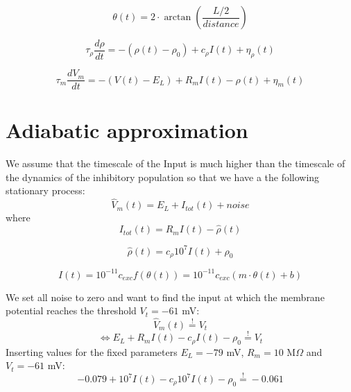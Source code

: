 \documentclass[a4paper,10pt,hidelinks]{scrreprt}
\begin{document}
	\begin{equation}
	\theta (t) = 2\cdot \arctan(\frac{L/2}{distance})
	\label{eq:theta}
	\end{equation}
	
	\begin{equation}
	\tau _{\rho} \frac{d\rho}{dt} = - (\rho(t) - \rho_{0}) + c_{\rho} I(t) + 
	\eta _{\rho}(t)
	\label{eq:inhib}
	\end{equation}
	
	\begin{equation}
	\tau _m \frac{dV_m}{dt} = - (V(t) - E_{L}) + R_{m} I(t) - \rho (t) +  \eta 
	_m (t)
	\label{eq:mcell}
	\end{equation}
	
	
	\section{Adiabatic approximation}
	We assume that the timescale of the Input is much higher than the timescale 
	of the dynamics of the inhibitory population so that we have a the 
	following stationary process:
	\begin{equation}
	\hat{V}_m(t) = E_{L} + I_{tot}(t) + noise
	\end{equation}
	where
	\begin{equation}
	I_{tot}(t) = R_{m} I(t) - \hat{\rho}(t)
	\end{equation}
	
	\begin{equation}
	\hat{\rho}(t) = c_{\rho} 10^{7} I(t) + \rho_{0}
	\end{equation}
	
	\begin{equation}
	I(t) = 10^{-11} c_{exc} f(\theta(t)) = 10^{-11} c_{exc} (m \cdot \theta(t) 
	+ b)
	\end{equation}
	
	We set all noise to zero and want to find the input at which the membrane 
	potential reaches the threshold $V_{t}=-61$ mV:
	\begin{equation}
	\hat{V}_m(t) \overset{!}{=} V_t
	\end{equation}
	\begin{equation}
	\Leftrightarrow E_{L} + R_{m} I(t) - c_{\rho} I(t) - \rho_{0} 
	\overset{!}{=} V_t
	\end{equation}
	Inserting values for the fixed parameters $E_{L}=-79$ mV, $R_{m}=10$ 
	M$\Omega$ 
	and $V_{t}=-61$ mV:
	\begin{equation}
	-0.079 + 10^{7} I(t) - c_{\rho} 10^{7} I(t) - \rho_{0} \overset{!}{=} -0.061
	\end{equation}
	
\end{document}
